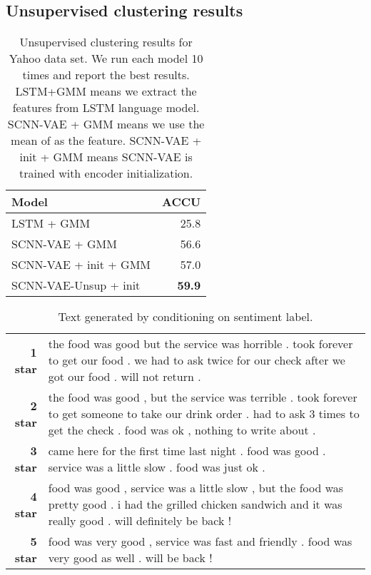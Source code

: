 \documentclass{article}
\begin{document}
\subsection{Unsupervised clustering results}
\begin{table}[!thp]
  \centering
  \begin{tabular}{l r}
    Model & ACCU  \\
    \toprule
    LSTM + GMM &  25.8  \\
    SCNN-VAE + GMM  & 56.6 \\
    SCNN-VAE + init + GMM & 57.0 \\
    \midrule
    SCNN-VAE-Unsup + init & {\bf 59.9} \\
    \bottomrule
  \end{tabular}
  \caption{Unsupervised clustering results for Yahoo data set. We run each
    model 10 times and report the best results. LSTM+GMM means we extract the
    features from LSTM language model. SCNN-VAE + GMM means we use the mean of
     as the feature. SCNN-VAE + init + GMM means
    SCNN-VAE is trained with encoder initialization.}
  \label{tab:yahoosemi_compare}
\end{table}
\begin{table*}[!thbp]
  \centering
  \small
  \begin{tabular}{r  p{12cm}}
    \toprule
    {\bf 1 star} & the food was good but the service was horrible .
    took forever to get our food .
    we had to ask twice for our check after we got our food . will not return .  \\
    {\bf 2 star} & the food was good , but the service was terrible .
    took forever to get someone to take our drink order .
    had to ask 3 times to get the check . food was ok , nothing to write about . \\
    {\bf 3 star} & came here for the first time last night .
    food was good . service was a little slow . food was just ok . \\
    {\bf 4 star} & food was good , service was a little slow ,
    but the food was pretty good . i had the grilled chicken sandwich and it
    was really good . will definitely be back !
 \\
    {\bf 5 star} & food was very good , service was fast and friendly .
    food was very good as well . will be back !                     \\
    \bottomrule
  \end{tabular}
  \caption{Text generated by conditioning on sentiment label.}
  \label{tab:yelp_sample_paper}
\end{table*}
\end{document}
